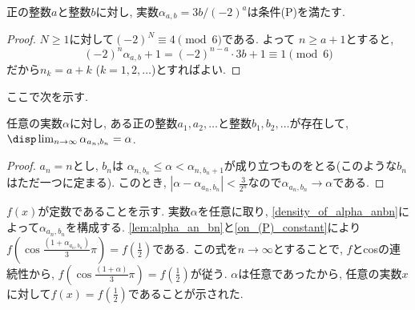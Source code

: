 \begin{lem} \label{lem:alpha_an_bn}
正の整数$a$と整数$b$に対し, 実数$\alpha_{a,b} = 3b/(-2)^a$は条件(P)を満たす. 
\end{lem}
\begin{proof}
$N\geq 1$に対して$(-2)^N \equiv 4\pmod{6}$である. よって 
$n\geq a+1$とすると, 
\[(-2)^n \alpha_{a,b} + 1 = (-2)^{n-a}\cdot 3b + 1 \equiv 1\pmod{6}\]
だから$n_k = a + k$ ($k=1,2,\dots$)とすればよい.     
\end{proof}

ここで次を示す. 
\begin{lem}[稠密性] \label{density_of_alpha_anbn}
任意の実数$\alpha$に対し, ある正の整数$a_1,a_2,\dots$と整数$b_1,b_2,\dots$が存在して, $\disp\lim_{n\to \infty}\alpha_{a_n, b_n} = \alpha$. 
\end{lem}

\begin{proof}
$a_n = n$とし, $b_n$は $\alpha_{n,b_n} \leq \alpha < \alpha_{n,b_n + 1}$が成り立つものをとる(このような$b_n$はただ一つに定まる). このとき, $|\alpha - \alpha_{a_n,b_n}| < \frac{3}{2^n}$なので$\alpha_{a_n,b_n}\to \alpha$である. 
\end{proof}

$f(x)$が定数であることを示す. 実数$\alpha$を任意に取り, \cref{density_of_alpha_anbn}によって$\alpha_{a_n,b_n}$を構成する. \cref{lem:alpha_an_bn}と\cref{on_(P)_constant}により$f(\cos{\frac{(1+\alpha_{a_n,b_n})}{3}\pi}) = f(\frac{1}{2})$である. この式を$n \to \infty$とすることで, $f$とcosの連続性から, $f(\cos{\frac{(1+\alpha)}{3}\pi}) = f(\frac{1}{2})$が従う. $\alpha$は任意であったから, 任意の実数$x$に対して$f(x) = f(\frac{1}{2})$であることが示された. 
